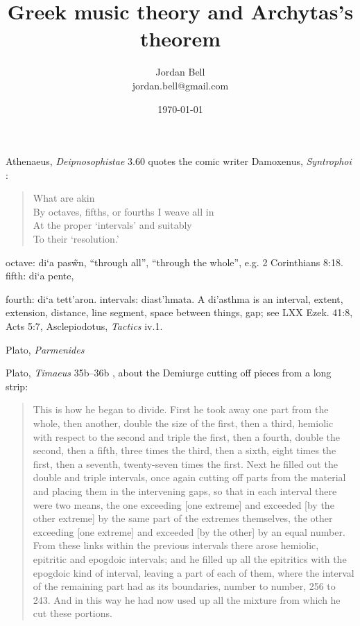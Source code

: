 \documentclass{article}
\newcommand{\textgreek}[1]{\begingroup\fontencoding{LGR}\selectfont#1\endgroup}
\theoremstyle{definition}
\begin{document}
\title{Greek music theory and Archytas's theorem}
\author{Jordan Bell\\
jordan.bell@gmail.com}
\date{\today}

\maketitle

Athenaeus, {\em Deipnosophistae} 3.60 quotes the comic writer Damoxenus, {\em Syntrophoi} \cite[p.~215]{edmonds}:

\begin{quote}
What are akin\\
By octaves, fifths, or fourths I weave all in\\
At the proper `intervals' and suitably\\
To their `resolution.'
\end{quote}

octave: \textgreek{di`a pas\~wn},  ``through all'', ``through the whole'', e.g. 2 Corinthians 8:18. fifth: \textgreek{di`a pente},

fourth: \textgreek{di`a tett'aron}. intervals:
\textgreek{diast'hmata}. A \textgreek{di'asthma} is an interval, extent, extension, distance, line segment, space between things, gap; see LXX Ezek. 41:8, Acts 5:7,
Asclepiodotus, {\em Tactics} iv.1.

Plato, {\em Parmenides} \cite[p.~38]{allen}

Plato, {\em Timaeus} 35b--36b \cite[pp.~59--60]{barker}, about the Demiurge cutting off pieces from a long strip:

\begin{quote}
This is how he began to divide. First he took away one part from the
whole, then another, double the size of the first, then a third, hemiolic with
respect to the second and triple the first, then a fourth, double the second, then
a fifth, three times the third, then a sixth, eight times the first, then a seventh,
twenty-seven times the first. Next he filled out the double and triple intervals,
once again cutting off parts from the material and placing them in the
intervening gaps, so that in each interval there were two means, the one
exceeding [one extreme] and exceeded [by the other extreme] by the same part
of the extremes themselves, the other exceeding [one extreme] and exceeded [by
the other] by an equal number. From these links within the previous intervals
there arose hemiolic, epitritic and epogdoic intervals; and he filled up all the
epitritics with the epogdoic kind of interval, leaving a part of each of them,
where the interval of the remaining part had as its boundaries, number to
number, 256 to 243. And in this way he had now used up all the mixture from
which he cut these portions.
\end{quote}
\end{document}
